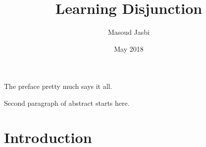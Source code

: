 \documentclass[oneside]{report}
\theoremstyle{definition}
\theoremstyle{definition}
\theoremstyle{definition}
\theoremstyle{remark}
\begin{document}
\title{Learning Disjunction}
\author{Masoud Jasbi}
\date{May 2018}


\makeatletter
\def\maxwidth{ %
  \ifdim\Gin@nat@width>\linewidth
    \linewidth
  \else
    \Gin@nat@width
  \fi
}
\makeatother

\renewcommand{\contentsname}{Contents}

\setlength{\parskip}{0pt}


\providecommand{\tightlist}{%
  \setlength{\itemsep}{0pt}\setlength{\parskip}{0pt}}




\beforepreface
{}
The preface pretty much says it all. \par

Second paragraph of abstract starts here.




\afterpreface


\chapter*{Introduction}\label{introduction}
\end{document}
